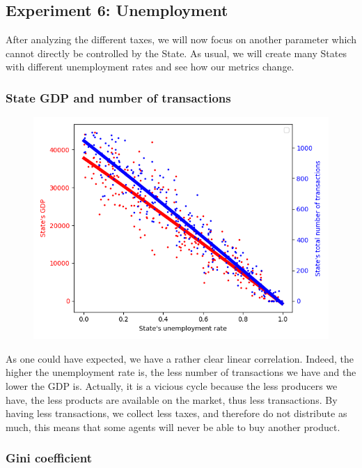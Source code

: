 {{    \subsection{Experiment 6: Unemployment}\label{exp:unemployment}
    After analyzing the different taxes, we will now focus on another parameter which cannot directly be controlled by the State. As usual, we will create many States with different unemployment rates and see how our metrics change.

            
        \subsubsection{State GDP and number of transactions}

        \begin{figure}
            \includegraphics[width=\linewidth]{img/exp/6_1.png}
        \end{figure} 
        {As one could have expected, we have a rather clear linear correlation. Indeed, the higher the unemployment rate is, the less number of transactions we have and the lower the GDP is. Actually, it is a vicious cycle because the less producers we have, the less products are available on the market, thus less transactions. By having less transactions, we collect less taxes, and therefore do not distribute as much, this means that some agents will never be able to buy another product. 
        \par

        \subsubsection{Gini coefficient}

}}}
